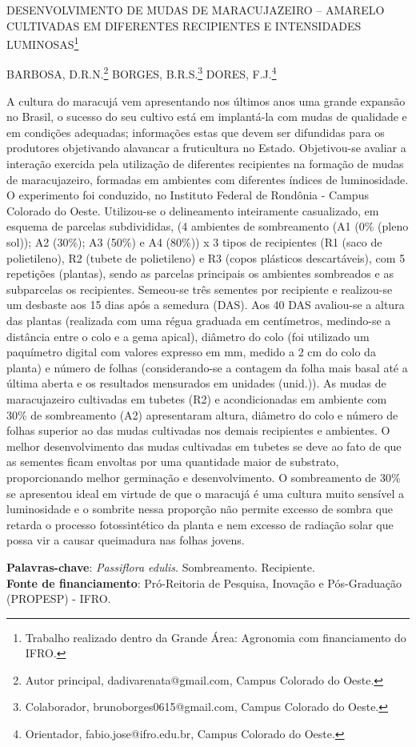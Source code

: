 \documentclass[article,12pt,onesidea,4paper,english,brazil]{abntex2}
\begin{document}
	
	
	\frenchspacing 
	
	\begin{center}
		\LARGE DESENVOLVIMENTO DE MUDAS DE MARACUJAZEIRO – AMARELO CULTIVADAS EM DIFERENTES RECIPIENTES E INTENSIDADES LUMINOSAS\footnote{Trabalho realizado dentro da Grande Área: Agronomia com financiamento do IFRO.}
		
		\normalsize
	BARBOSA, D.R.N.\footnote{Autor principal, dadivarenata@gmail.com, Campus Colorado do Oeste.} 
		BORGES, B.R.S.\footnote{Colaborador, brunoborges0615@gmail.com, Campus Colorado do Oeste.} 
		DORES, F.J.\footnote{Orientador, fabio.jose@ifro.edu.br, Campus Colorado do Oeste.} 
		
	\end{center}
	
	\noindent A cultura do maracujá vem apresentando nos últimos anos uma grande expansão no Brasil, o sucesso do seu cultivo está em implantá-la com mudas de qualidade e em condições adequadas; informações estas que devem ser difundidas para os produtores objetivando alavancar a fruticultura no Estado. Objetivou-se avaliar a interação exercida pela utilização de diferentes recipientes na formação de mudas de maracujazeiro, formadas em ambientes com diferentes índices de luminosidade. O experimento foi conduzido, no Instituto Federal de Rondônia - Campus Colorado do Oeste. Utilizou-se o delineamento inteiramente casualizado, em esquema de parcelas subdivididas, (4 ambientes de sombreamento (A1 (0\% (pleno sol)); A2 (30\%); A3 (50\%) e A4 (80\%)) x 3 tipos de recipientes (R1 (saco de polietileno), R2 (tubete de polietileno) e R3 (copos plásticos descartáveis), com 5 repetições (plantas), sendo as parcelas principais os ambientes sombreados e as subparcelas os recipientes. Semeou-se três sementes por recipiente e realizou-se um desbaste aos 15 dias após a semedura (DAS). Aos 40 DAS avaliou-se a altura das plantas (realizada com uma régua graduada em centímetros, medindo-se a distância entre o colo e a gema apical), diâmetro do colo (foi utilizado um paquímetro digital com valores expresso em mm, medido a 2 cm do colo da planta) e número de folhas (considerando-se a contagem da folha mais basal até a última aberta e os resultados mensurados em unidades (unid.)). As mudas de maracujazeiro cultivadas em tubetes (R2) e acondicionadas em ambiente com 30\% de sombreamento (A2) apresentaram altura, diâmetro do colo e número de folhas superior ao das mudas cultivadas nos demais recipientes e ambientes. O melhor desenvolvimento das mudas cultivadas em tubetes se deve ao fato de que as sementes ficam envoltas por uma quantidade maior de substrato, proporcionando melhor germinação e desenvolvimento. O sombreamento de 30\% se apresentou ideal em virtude de que o maracujá é uma cultura muito sensível a luminosidade e o sombrite nessa proporção não permite excesso de sombra que retarda o processo fotossintético da planta e nem excesso de radiação solar que possa vir a causar queimadura nas folhas jovens.
	
	\vspace{\onelineskip}
	
	\noindent
	\textbf{Palavras-chave}: \textit{Passiflora edulis}. Sombreamento. Recipiente. \\
	\textbf{Fonte de financiamento}: Pró-Reitoria de Pesquisa, Inovação e Pós-Graduação (PROPESP) - IFRO.
	
\end{document}
